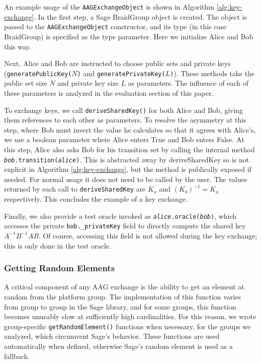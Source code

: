 An example usage of the \texttt{AAGExchangeObject} is shown in Algorithm \ref{alg:key-exchange}. In the first step, a Sage BraidGroup object is created. The object is passed to the \texttt{AAGExchangeObject} constructor, and its type (in this case BraidGroup) is specified as the type parameter. Here we initialize Alice and Bob this way.

Next, Alice and Bob are instructed to choose public sets and private keys (\texttt{generatePublicKey($N$)} and \texttt{generatePrivateKey($L$)}). These methods take the public set size $N$ and private key size $L$ as parameters. The influence of each of these parameters is analyzed in the evaluation section of this paper.

To exchange keys, we call \texttt{deriveSharedKey()} for both Alice and Bob, giving them references to each other as parameters. To resolve the asymmetry at this step, where Bob must invert the value he calculates so that it agrees with Alice's, we use a boolean parameter where Alice enters True and Bob enters False. At this step, Alice also asks Bob for his transition set by calling the internal method \texttt{\textit{bob}.transition(\textit{alice})}. This is abstracted away by deriveSharedKey so is not explicit in Algorithm \ref{alg:key-exchange}, but the method is publically exposed if needed. For normal usage it does not need to be called by the user. The values returned by each call to \texttt{deriveSharedKey} are $K_a$ and $(K_b)^{-1}=K_a$ respectively. This concludes the example of a key exchange.

Finally, we also provide a test oracle invoked as \texttt{\textit{alice}.oracle(\textit{bob})}, which accesses the private \texttt{bob.\_privateKey} field to directly compute the shared key $A^{-1}B^{-1}AB$. Of course, accessing this field is not allowed during the key exchange; this is only done in the test oracle.

\subsubsection{Getting Random Elements} A critical component of any AAG exchange is the ability to get an element at random from the platform group. The implementation of this function varies from group to group in the Sage library, and for some groups, this function becomes unusably slow at sufficiently high cardinalities. For this reason, we wrote group-specific \texttt{getRandomElement()} functions when necessary, for the groups we analyzed, which circumvent Sage's behavior. These functions are used automatically when defined, otherwise Sage's random element is used as a fallback.

